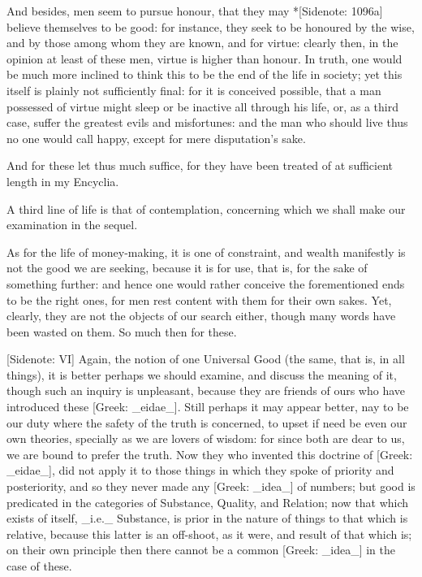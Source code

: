 And besides, men seem to pursue honour, that they may *[Sidenote: 1096a]
believe themselves to be good: for instance, they seek to be honoured
by the wise, and by those among whom they are known, and for virtue:
clearly then, in the opinion at least of these men, virtue is higher
than honour. In truth, one would be much more inclined to think this
to be the end of the life in society; yet this itself is plainly not
sufficiently final: for it is conceived possible, that a man possessed
of virtue might sleep or be inactive all through his life, or, as a
third case, suffer the greatest evils and misfortunes: and the man who
should live thus no one would call happy, except for mere disputation's
sake.

And for these let thus much suffice, for they have been treated of at
sufficient length in my Encyclia.

A third line of life is that of contemplation, concerning which we shall
make our examination in the sequel.

As for the life of money-making, it is one of constraint, and wealth
manifestly is not the good we are seeking, because it is for use, that
is, for the sake of something further: and hence one would rather
conceive the forementioned ends to be the right ones, for men rest
content with them for their own sakes. Yet, clearly, they are not the
objects of our search either, though many words have been wasted on
them. So much then for these.

[Sidenote: VI] Again, the notion of one Universal Good (the same, that
is, in all things), it is better perhaps we should examine, and discuss
the meaning of it, though such an inquiry is unpleasant, because they
are friends of ours who have introduced these [Greek: _eidae_]. Still
perhaps it may appear better, nay to be our duty where the safety of the
truth is concerned, to upset if need be even our own theories, specially
as we are lovers of wisdom: for since both are dear to us, we are bound
to prefer the truth. Now they who invented this doctrine of [Greek:
_eidae_], did not apply it to those things in which they spoke of
priority and posteriority, and so they never made any [Greek: _idea_] of
numbers; but good is predicated in the categories of Substance, Quality,
and Relation; now that which exists of itself, _i.e._ Substance, is
prior in the nature of things to that which is relative, because this
latter is an off-shoot, as it were, and result of that which is; on
their own principle then there cannot be a common [Greek: _idea_] in the
case of these.

